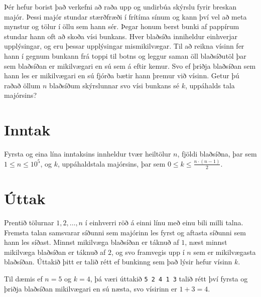 
Þér hefur borist það verkefni að raða upp og undirbúa skýrslu fyrir breskan majór. Þessi majór stundar
stærðfræði í frítíma sínum og kann því vel að meta mynstur og tölur í öllu sem hann sér. Þegar honum
berst bunki af pappírum stundar hann oft að skoða vísi bunkans. Hver blaðsíða inniheldur einhverjar upplýsingar,
og eru þessar upplýsingar mismikilvægar. Til að reikna vísinn fer hann í gegnum bunkann
frá toppi til botns og leggur saman öll blaðsíðutöl þar sem blaðsíðan er mikilvægari en sú sem á eftir kemur.
Svo ef þriðja blaðsíðan sem hann les er mikilvægari en sú fjórða bætir hann þremur við vísinn.
Getur þú raðað öllum $n$ blaðsíðum skýrslunnar svo vísi bunkans sé $k$, uppáhalds tala majórsins?

\section*{Inntak}
Fyrsta og eina lína inntaksins innheldur tvær heiltölur $n$, fjöldi blaðsíðna, þar sem $1 \leq n \leq 10^5$,
og $k$, uppáhaldstala majórsins, þar sem $0 \leq k \leq \frac{n \cdot (n-1)}{2}$.

\section*{Úttak}
Prentið tölurnar $1, 2, \dots, n$ í einhverri röð á einni línu með einu bili milli talna. Fremsta talan samsvarar
síðunni sem majórinn les fyrst og aftasta síðunni sem hann les síðast.
Minnst mikilvæga blaðsíðan er táknuð af $1$,
næst minnst mikilvæga blaðsíðan er táknuð af $2$,
og svo framvegis upp í $n$ sem er mikilvægasta blaðsíðan.
Úttakið þitt er talið rétt ef bunkinng sem það lýsir hefur vísinn $k$.

Til dæmis ef $n=5$ og $k=4$, þá væri úttakið \texttt{5 2 4 1 3} talið rétt því fyrsta og þriðja blaðsíðan mikilvægari en sú næsta, svo vísirinn er $1+3=4$.
